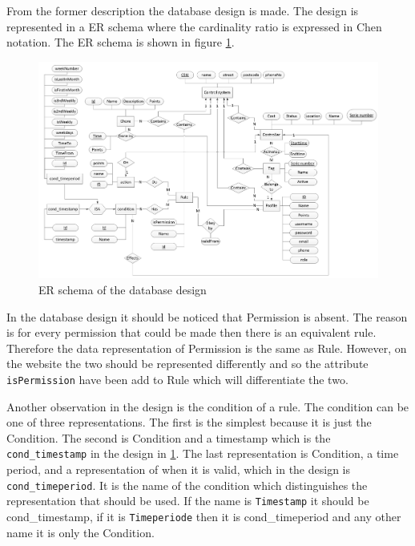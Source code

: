 From the former description the database design is made. The design is represented in a ER schema where the cardinality ratio is expressed in 
Chen notation. The ER schema is shown in figure \ref{fig:ERdiagram}. 

\begin{figure}
	\centering
		\includegraphics[width=1.00\textwidth]{images/ERdiagram.jpg}
	\caption{ER schema of the database design}
	\label{fig:ERdiagram}
\end{figure}

In the database design it should be noticed that Permission is absent. The reason is for every permission that could be made then there is an equivalent rule. Therefore the data representation of Permission is the same as Rule. However, on the website the two should be represented differently and so the attribute \texttt{isPermission} have been add to Rule which will differentiate the two.

Another observation in the design is the condition of a rule. The condition can be one of three representations. The first is the simplest because it is just the Condition. The second is Condition and a timestamp which is the \texttt{cond\_timestamp} in the design in \ref{fig:ERdiagram}. The last representation is Condition, a time period, and a representation of when it is valid, which in the design is \texttt{cond\_timeperiod}. 
 It is the name of the condition which distinguishes the representation that should be used. If the name is \texttt{Timestamp} it should be cond\_timestamp, if it is \texttt{Timeperiode} then it is cond\_timeperiod and any other name it is only the Condition. 


